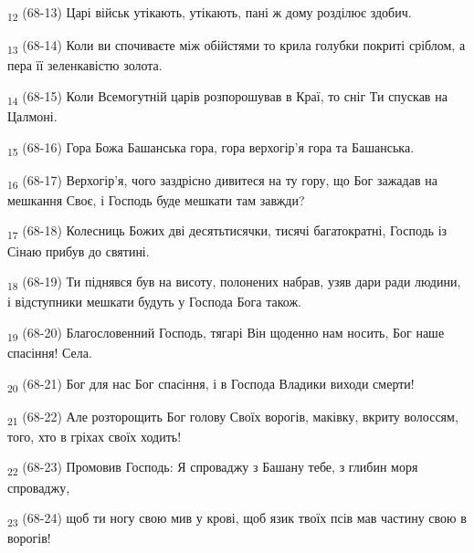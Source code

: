 \begin{tcolorbox}
\textsubscript{12} (68-13) Царі військ утікають, утікають, пані ж дому розділює здобич.
\end{tcolorbox}
\begin{tcolorbox}
\textsubscript{13} (68-14) Коли ви спочиваєте між обійстями то крила голубки покриті сріблом, а пера її зеленкавістю золота.
\end{tcolorbox}
\begin{tcolorbox}
\textsubscript{14} (68-15) Коли Всемогутній царів розпорошував в Краї, то сніг Ти спускав на Цалмоні.
\end{tcolorbox}
\begin{tcolorbox}
\textsubscript{15} (68-16) Гора Божа Башанська гора, гора верхогір'я гора та Башанська.
\end{tcolorbox}
\begin{tcolorbox}
\textsubscript{16} (68-17) Верхогір'я, чого заздрісно дивитеся на ту гору, що Бог зажадав на мешкання Своє, і Господь буде мешкати там завжди?
\end{tcolorbox}
\begin{tcolorbox}
\textsubscript{17} (68-18) Колесниць Божих дві десятьтисячки, тисячі багатократні, Господь із Сінаю прибув до святині.
\end{tcolorbox}
\begin{tcolorbox}
\textsubscript{18} (68-19) Ти піднявся був на висоту, полонених набрав, узяв дари ради людини, і відступники мешкати будуть у Господа Бога також.
\end{tcolorbox}
\begin{tcolorbox}
\textsubscript{19} (68-20) Благословенний Господь, тягарі Він щоденно нам носить, Бог наше спасіння! Села.
\end{tcolorbox}
\begin{tcolorbox}
\textsubscript{20} (68-21) Бог для нас Бог спасіння, і в Господа Владики виходи смерти!
\end{tcolorbox}
\begin{tcolorbox}
\textsubscript{21} (68-22) Але розторощить Бог голову Своїх ворогів, маківку, вкриту волоссям, того, хто в гріхах своїх ходить!
\end{tcolorbox}
\begin{tcolorbox}
\textsubscript{22} (68-23) Промовив Господь: Я спроваджу з Башану тебе, з глибин моря спроваджу,
\end{tcolorbox}
\begin{tcolorbox}
\textsubscript{23} (68-24) щоб ти ногу свою мив у крові, щоб язик твоїх псів мав частину свою в ворогів!
\end{tcolorbox}

